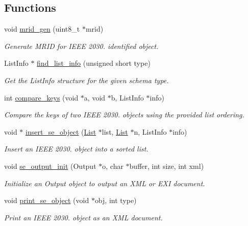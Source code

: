 \subsection*{Functions}
\begin{DoxyCompactItemize}
\item 
void \hyperlink{group__se__object_gad96c116a02961bde7e4a699139f8adea}{mrid\+\_\+gen} (uint8\+\_\+t $\ast$mrid)
\begin{DoxyCompactList}\small\item\em Generate M\+R\+ID for I\+E\+EE 2030. identified object. \end{DoxyCompactList}\item 
List\+Info $\ast$ \hyperlink{group__se__object_ga249023246a074e695d42948c654dba6a}{find\+\_\+list\+\_\+info} (unsigned short type)
\begin{DoxyCompactList}\small\item\em Get the List\+Info structure for the given schema type. \end{DoxyCompactList}\item 
int \hyperlink{group__se__object_gaa45cdec61c8e3594c5d084c6cea59c19}{compare\+\_\+keys} (void $\ast$a, void $\ast$b, List\+Info $\ast$info)
\begin{DoxyCompactList}\small\item\em Compare the keys of two I\+E\+EE 2030. objects using the provided list ordering. \end{DoxyCompactList}\item 
void $\ast$ \hyperlink{group__se__object_ga1d9e0f10dfb0525cdae0e42a0d01a97a}{insert\+\_\+se\+\_\+object} (\hyperlink{structList}{List} $\ast$list, \hyperlink{structList}{List} $\ast$n, List\+Info $\ast$info)
\begin{DoxyCompactList}\small\item\em Insert an I\+E\+EE 2030. object into a sorted list. \end{DoxyCompactList}\item 
void \hyperlink{group__se__object_gaf615b5ea6652436f3f63c95fb82df4bc}{se\+\_\+output\+\_\+init} (Output $\ast$o, char $\ast$buffer, int size, int xml)
\begin{DoxyCompactList}\small\item\em Initialize an Output object to output an X\+ML or E\+XI document. \end{DoxyCompactList}\item 
void \hyperlink{group__se__object_gafe7627c4d5ad5e1a035a8be38db3260e}{print\+\_\+se\+\_\+object} (void $\ast$obj, int type)
\begin{DoxyCompactList}\small\item\em Print an I\+E\+EE 2030. object as an X\+ML document. \end{DoxyCompactList}\end{DoxyCompactItemize}


